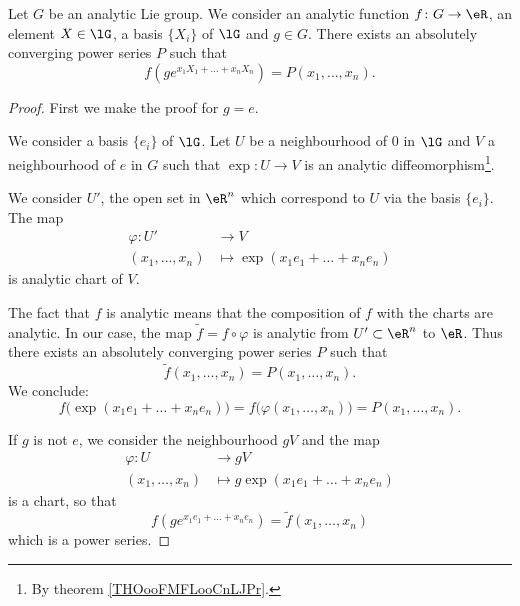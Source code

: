 \begin{lemma}     \label{LEMooPILVooHQbtAH}
	Let \( G\) be an analytic Lie group. We consider an analytic function \( f\colon G\to \eR\), an element \( X\in \lG\), a basis \( \{ X_i \}\) of \( \lG\) and \( g\in G\). There exists an absolutely converging power series \( P\) such that
	\begin{equation}
		f(g e^{x_1X_1+\ldots +x_nX_n})=P(x_1,\ldots, x_n).
	\end{equation}
\end{lemma}

\begin{proof}
	First we make the proof for \( g=e\).

	We consider a basis \( \{ e_i \}\) of \( \lG\). Let \( U\) be a neighbourhood of \( 0\) in \( \lG\) and \( V\) a neighbourhood of \( e\) in \( G\) such that \( \exp\colon U\to V\) is an analytic diffeomorphism\footnote{By theorem \ref{THOooFMFLooCnLJPr}.}.

	We consider \( U'\), the open set in \( \eR^n\) which correspond to \( U\) via the basis \( \{ e_i \}\). The map
	\begin{equation}
		\begin{aligned}
			\varphi\colon U'  & \to V                              \\
			(x_1,\ldots, x_n) & \mapsto \exp(x_1e_1+\ldots+x_ne_n)
		\end{aligned}
	\end{equation}
	is analytic chart of \( V\).

	The fact that \( f\) is analytic means that the composition of \( f\) with the charts are analytic. In our case, the map \( \tilde f =f\circ\varphi\) is analytic from \( U'\subset \eR^n\) to \( \eR\). Thus there exists an absolutely converging power series \( P\) such that
	\begin{equation}
		\tilde f(x_1,\ldots, x_n)=P(x_1,\ldots, x_n).
	\end{equation}
	We conclude:
	\begin{equation}
		f\big( \exp(x_1e_1+\ldots +x_ne_n) \big)=f\big( \varphi(x_1,\ldots, x_n) \big)=P(x_1,\ldots, x_n).
	\end{equation}

	If \( g\) is not \( e\), we consider the neighbourhood \( gV\) and the map
	\begin{equation}
		\begin{aligned}
			\varphi\colon U   & \to gV                               \\
			(x_1,\ldots, x_n) & \mapsto g\exp(x_1e_1+\ldots +x_ne_n)
		\end{aligned}
	\end{equation}
	is a chart, so that
	\begin{equation}
		f(g e^{x_1e_1+\ldots +x_ne_n})=\tilde f(x_1,\ldots, x_n)
	\end{equation}
	which is a power series.
\end{proof}

